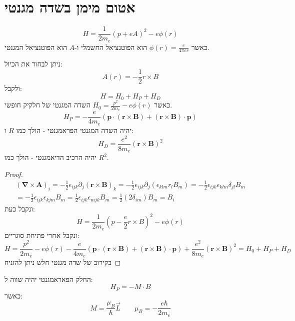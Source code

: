 \documentclass{tstextbook}
\begin{document}
\section{אטום מימן בשדה מגנטי}

\begin{definition}
$$H=\frac{1}{2m_{e}}\left(p+e A\right)^{2}-e\phi(r)$$
כאשר \(\phi(r)=\frac{e}{4\pi\varepsilon r}\) הוא הפוטנציאל החשמלי ו-\(A\) הוא הפוטנציאל המגנטי.

\end{definition}
\begin{proposition}
ניתן לבחור את הכיול:
$$A(r)=-\frac{1}{2}r\times B$$
ולקבל:
$$H=H_{0}+H_{P}+H_{D}$$
כאשר \(H_{0}=\frac{p^{2}}{2m_{e}}-e\phi(r)\) השדה המגנטי של חלקיק חופשי. 
$$H_{P}=-\frac{e}{4m_{e}}\left(\mathbf{p}\cdot(\mathbf{r}\times\mathbf{B})+(\mathbf{r}\times\mathbf{B})\cdot\mathbf{p}\right)$$
יהיה השדה המגנטי הפראמגנטי - הולך כמו \(R\) ו:
$$H_{D}=\frac{e^{2}}{8m_{e}}\left(\mathbf{r}\times\mathbf{B}\right)^{2}$$
יהיה הרכיב הדיאמגנטי - הולך כמו \(R^{2}\).

\end{proposition}
\begin{proof}
\begin{gather*}\left(\mathbf{\nabla}\times\mathbf{A}\right)_{i}=-{\frac{1}{2}}\epsilon_{i j k}\partial_{j}\left(\mathbf{r}\times\mathbf{B}\right)_{k}=-{\frac{1}{2}}\epsilon_{i j k}\partial_{j}\left(\epsilon_{k l m}r_{l}B_{m}\right)=-{\frac{1}{2}}\epsilon_{i j k}\epsilon_{k l m}\delta_{j l}B_{m}\\=-\frac{1}{2}\epsilon_{i j k}\epsilon_{k j m}B_{m}=\frac{1}{2}\epsilon_{i j k}\epsilon_{m j k}B_{m}=\frac{1}{2}\left(2\delta_{i m}\right)B_{m}=B_{i} 
\end{gather*}
ונקבל כעת:
$$H=\frac{1}{2m_{e}}\left(p-\frac{e}{2}r\times B\right)^{2}-e\phi(r)$$
ונקבל אחרי פתיחת סוגריים:
$$H=\frac{p^{2}}{2m_{e}}-e\phi(r)-\frac{e}{4m_{e}}\left(\mathbf{p}\cdot(\mathbf{r}\times\mathbf{B})+(\mathbf{r}\times\mathbf{B})\cdot\mathbf{p}\right)+\frac{e^{2}}{8m_{e}}\left(\mathbf{r}\times\mathbf{B}\right)^{2}=H_{0}+H_{P}+H_{D}$$
בקירוב של שדה מגנטי חלש ניתן להזניח

\end{proof}
\begin{proposition}
החלק הפאראמגנטי יהיה שווה ל:
$$H_{P}=-M\cdot B$$
כאשר:
$$M=\frac{\mu_{B}}{\hbar}\vec{L} \qquad \mu_{B}=-\frac{e\hbar}{2m_{e}}$$

\end{proposition}
\end{document}
